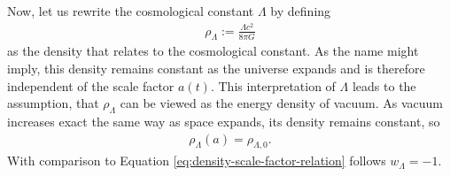 \noindent Now, let us rewrite the cosmological constant $\Lambda$ by defining
\begin{align}
    \rho_{\Lambda} := \frac{\Lambda c^2}{8\pi G}
\end{align}
as the density that relates to the cosmological constant. As the name might imply, this density remains constant as the universe expands and is therefore independent of the scale factor $a(t)$.
This interpretation of $\Lambda$ leads to the assumption, that $\rho_{\Lambda}$ can be viewed as the energy density of vacuum. As vacuum increases exact the same way as space expands, its density remains constant, so
\begin{align}
    \rho_{\Lambda}(a) = \rho_{\Lambda,0}. \label{eq:lambda-density-scale}
\end{align}
With comparison to Equation \eqref{eq:density-scale-factor-relation} follows $w_{\Lambda} = -1$.

